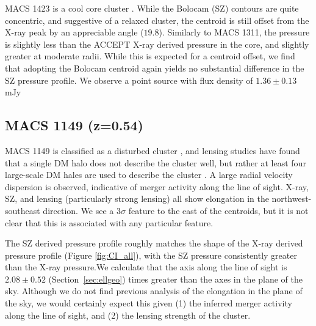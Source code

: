 
MACS 1423 is a cool core cluster \citep{mann2012,sayers2013}. While the Bolocam (SZ) contours are quite concentric,
and suggestive of a relaxed cluster, the centroid is still offset from the X-ray peak by an appreciable angle 
($19.8$\asec). Similarly to MACS 1311, the pressure is slightly less than the ACCEPT X-ray derived pressure in the
core, and slightly greater at moderate radii. While this is expected for a centroid offset, we find that adopting
the Bolocam centroid again yields no substantial difference in the SZ pressure profile.
We observe a point source with flux density of $1.36 \pm 0.13$ mJy



\subsection{MACS 1149 (z=0.54)}
\label{sec:results_m1149}


MACS 1149 is classified as a disturbed cluster \citep[e.g.][]{mann2012,sayers2013}, and lensing studies have found
that a single DM halo does not describe the cluster well, but rather at least four large-scale DM hales are used to
describe the cluster \citep{smith2009}. A large radial velocity dispersion \citep[1800 km s$^{-1}$][]{ebeling2007} is 
observed, indicative of merger activity along the line of sight. X-ray, SZ, and lensing (particularly 
strong lensing) all show elongation in the northwest-southeast direction. We see a $3\sigma$ feature to the east of
the centroids, but it is not clear that this is associated with any particular feature.

The SZ derived pressure profile roughly matches the shape of the X-ray derived pressure profile (Figure
\ref{fig:CI_all}), with the SZ pressure consistently greater than the X-ray pressure.We calculate
that the axis along the line of sight is $2.08 \pm 0.52$ (Section~\ref{sec:ellgeo}) times greater than the axes in the plane
of the sky. Although we do not find previous analysis of the elongation in the plane of the sky, we would certainly
expect this given (1) the inferred merger activity along the line of sight, and (2) the lensing strength of the cluster.

